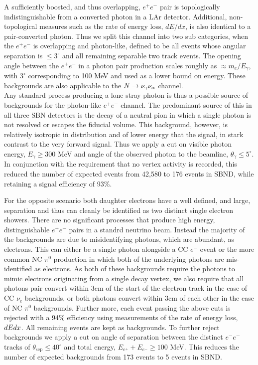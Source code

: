 \documentclass[11pt, a4paper]{article}
\def\ster{\ensuremath N}
\begin{document}
A sufficiently boosted, and thus overlapping, $e^+e^-$ pair is topologically
indistinguishable from a converted photon in a LAr detector. Additional,
non-topological measures such as the rate of energy loss, $dE/dx$, is also
identical to a pair-converted photon. Thus we split this channel into two sub
categories, when the $e^+e^-$ is overlapping and photon-like, defined to be all
events whose angular separation is $\leq 3^\circ$\cite{Spitz:2011wba} and all
remaining separable two track events. The opening angle between the $e^+e^-$ in
a photon pair production scales roughly as $\approx m_e/E_\gamma$, with
$3^\circ$ corresponding to 100 MeV and used as a lower bound on energy. These
backgrounds are also applicable to the $\ster \rightarrow \nu_\gamma
\nu_\alpha$ channel.\\ 

Any standard process producing a lone stray photon is thus a possible source of
backgrounds for the photon-like $e^+e^-$ channel. The predominant source of
this in all three SBN detectors is the decay of a neutral pion in which a
single photon is not resolved or escapes the fiducial volume. This background,
however, is relatively isotropic in distribution and of lower energy that the
signal, in stark contrast to the very forward signal. Thus we apply a cut on
visible photon energy, $E_\gamma \geq 300 $ MeV and angle of the observed
photon to the beamline, $\theta_\gamma \leq 5^\circ$. In conjunction with the
requirement that no vertex activity is recorded, this reduced the number of
expected events from 42,580 to 176 events in SBND, while retaining a signal
efficiency of 93\%.

For the opposite scenario both daughter electrons have a well defined, and
large, separation and thus can cleanly be identified as two distinct single
electron showers. There are no significant processes that produce high energy,
distinguishable $e^+e^-$ pairs in a standrd neutrino beam.  Instead the
majority of the backgrounds are due to misidentifying photons, which are
abundant, as electrons. This can either be a single photon alongside a CC $e^-$
event or the more common NC $\pi^0$ production in which both of the underlying
photons are mis-identified as electrons. As both of these backgrounds require
the photons to mimic electrons originating from a single decay vertex, we also
require that all photons pair convert within 3cm of the start of the electron
track in the case of CC $\nu_e$ backgrounds, or both photons convert within 3cm
of each other in the case of NC $\pi^0$ backgrounds. Further more, each event
passing the above cuts is rejected with a 94\% efficiency using measurements of
the rate of energy loss, $dE\/dx$. All remaining events are kept as
backgrounds. To further reject backgrounds we apply a cut on angle of
separation between the distinct $e^-e^-$ tracks of $\theta_\text{sep}\leq 40
^\circ$ and total energy, $E_{e^+}+E_{e^-} \geq 100$ MeV. This reduces the
number of expected backgrounds from 173 events to 5 events in SBND. 
\end{document}
